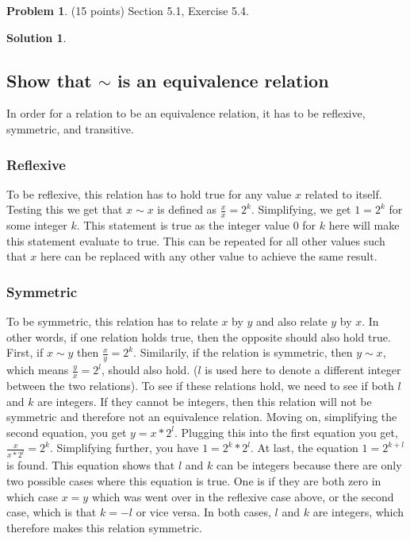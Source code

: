 \documentclass{article}
\theoremstyle{definition}
\newtheorem{problem}{Problem}
\newtheorem*{solution}{Solution}
\begin{document}
\newpage
\begin{problem} (15 points) Section 5.1, Exercise 5.4.
\end{problem}
\begin{solution} 
\hspace{1cm}
\subsection*{Show that $\sim$ is an equivalence relation}
In order for a relation to be an equivalence relation, it has to be reflexive, symmetric, and transitive. 
\subsubsection*{Reflexive}
To be reflexive, this relation has to hold true for any value $x$ related to itself. Testing this we get that $x \sim x$ is defined as $\frac{x}{x} = 2^k$. Simplifying, we get $1 = 2^k$ for some integer $k$. This statement is true as the integer value $0$ for $k$ here will make this statement evaluate to true. This can be repeated for all other values such that $x$ here can be replaced with any other value to achieve the same result.
\subsubsection*{Symmetric}
To be symmetric, this relation has to relate $x$ by $y$ and also relate $y$ by $x$. In other words, if one relation holds true, then the opposite should also hold true. First, if $x \sim y$ then $\frac{x}{y} = 2^k$. Similarily, if the relation is symmetric, then $y \sim x$, which means $\frac{y}{x} = 2^l$, should also hold. ($l$ is used here to denote a different integer between the two relations). To see if these relations hold, we need to see if both $l$ and $k$ are integers. If they cannot be integers, then this relation will not be symmetric and therefore not an equivalence relation. Moving on, simplifying the second equation, you get $y = x * 2^l$. Plugging this into the first equation you get, $\frac{x}{x*2^l} = 2^k$. Simplifying further, you have $1 = 2^k * 2^l$. At last, the equation $1 = 2^{k+l}$ is found. This equation shows that $l$ and $k$ can be integers because there are only two possible cases where this equation is true. One is if they are both zero in which case $x = y$ which was went over in the reflexive case above, or the second case, which is that $k = -l$ or vice versa. In both cases, $l$ and $k$ are integers, which therefore makes this relation symmetric.

\end{solution}
\end{document}
